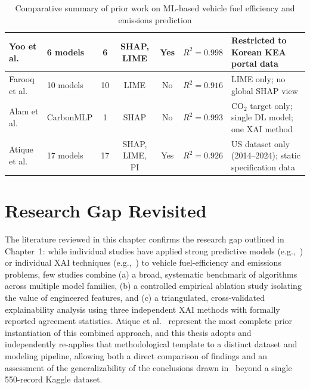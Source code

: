 \begin{table}[H]
{\begin{tabular}{|p{3cm}|p{2.8cm}|c|c|c|p{2.7cm}|p{4cm}|}
Yoo et al.~\cite{yoo2025machine}
& 6 models
& 6
& SHAP, LIME
& Yes
& $R^2 = 0.998$
& Restricted to Korean KEA portal data \\
\hline

Farooq et al.~\cite{farooq2025interpretable}
& 10 models
& 10
& LIME
& No
& $R^2 = 0.916$
& LIME only; no global SHAP view \\
\hline

Alam et al.~\cite{alam2025deep}
& CarbonMLP
& 1
& SHAP
& No
& $R^2 = 0.993$
& CO$_2$ target only; single DL model; one XAI method \\
\hline

Atique et al.~\cite{atique2026explainable}
& 17 models
& 17
& SHAP, LIME, PI
& Yes
& $R^2 = 0.926$
& US dataset only (2014--2024); static specification data \\
\hline

\end{tabular}
}
\caption{Comparative summary of prior work on ML-based vehicle fuel efficiency and emissions prediction}
\label{tab:related_work}
\end{table}



\section{Research Gap Revisited}

The literature reviewed in this chapter confirms the research gap outlined in Chapter~1: while individual studies have applied strong predictive models (e.g.,~\cite{alhakamy2023used}\cite{canal2024machine}) or individual XAI techniques (e.g.,~\cite{ghadi2025explainable,haque2025ensemblexai,alam2025deep}) to vehicle fuel-efficiency and emissions problems, few studies combine (a) a broad, systematic benchmark of algorithms across multiple model families, (b) a controlled empirical ablation study isolating the value of engineered features, and (c) a triangulated, cross-validated explainability analysis using three independent XAI methods with formally reported agreement statistics. Atique et al.~\cite{atique2026explainable} represent the most complete prior instantiation of this combined approach, and this thesis adopts and independently re-applies that methodological template to a distinct dataset and modeling pipeline, allowing both a direct comparison of findings and an assessment of the generalizability of the conclusions drawn in~\cite{atique2026explainable} beyond a single 550-record Kaggle dataset.


